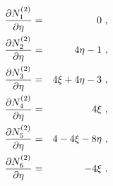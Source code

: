 \begin{eqnarray}
\label{bfquadtrdy1}
\ppd{N_1^{(2)}}{\eta} &=& 0\ ,
\\
\label{bfquadtrdy2}
\ppd{N_2^{(2)}}{\eta} &=& 4 \eta -1\ ,
\\
\label{bfquadtrdy3}
\ppd{N_3^{(2)}}{\eta} &=& 4 \xi + 4 \eta -3\ ,
\\
\label{bfquadtrdy4}
\ppd{N_4^{(2)}}{\eta} &=& 4 \xi\ ,
\\
\label{bfquadtrdy5}
\ppd{N_5^{(2)}}{\eta} &=& 4 - 4 \xi - 8 \eta\ ,
\\
\label{bfquadtrdy6}
\ppd{N_6^{(2)}}{\eta} &=& - 4 \xi\ .
\end{eqnarray}



